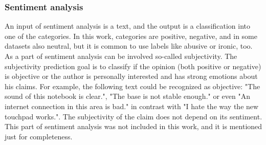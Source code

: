 \subsubsection{Sentiment analysis}
An input of sentiment analysis is a text, and the output is a classification into one of the categories. In this work, categories are positive, negative, and in some datasets also neutral, but it is common to use labels like abusive or ironic, too.
As a part of sentiment analysis can be involved so-called subjectivity\citep{Montoyo2012}. The subjectivity prediction goal is to classify if the
opinion (both positive or negative) is objective or the author is personally interested and has strong emotions about his claims. For example, the following text could be recognized as objective: "The sound of this notebook is clear.", "The base is not stable enough." or even "An internet connection in this area is bad." in contrast with "I hate the way the new touchpad works.". The subjectivity of the claim does not depend on its sentiment. This part of sentiment analysis was not included in this work, and it is mentioned just for completeness.


